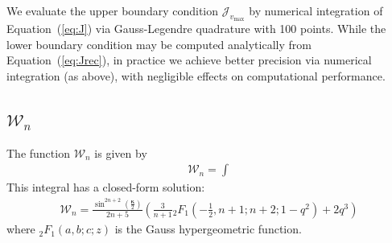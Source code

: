 \documentclass[modern]{aastex62}
\newcommand{\STARRYQUADPOINTS}{100\xspace}
\newcommand{\kap}{\boldsymbol{\kappa}}
\newcommand{\vmax}{{v_\mathrm{max}}}
\begin{document}
We evaluate the upper boundary condition $\mathcal{J}_{\vmax}$ by numerical
integration of Equation~(\ref{eq:J}) via Gauss-Legendre quadrature with
\STARRYQUADPOINTS points. While the lower boundary condition may be computed
analytically from Equation~(\ref{eq:Jrec}),
in practice we achieve better precision via numerical
integration (as above), with negligible effects on computational performance.

\subsection{$\mathcal{W}_n$}
%
The function $\mathcal{W}_n$ is given by
%
\begin{align}
    \label{eq:W}
    \mathcal{W}_n = \int
\end{align}
%
This integral has a closed-form solution:
%
\begin{align}
    \label{eq:Wsol}
    \mathcal{W}_n =
    \frac{\sin^{2n + 2}\left(\frac{\kap}{2}\right)}{2n + 5}
    \left(
    \frac{3}{n+1}
        {_2F_1}\left(-\frac{1}{2}, n + 1; n + 2; 1 - q^2\right) + 2 q^3
    \right)
\end{align}
%
where ${_2F_1}(a, b; c; z)$ is the Gauss hypergeometric function.




\end{document}
